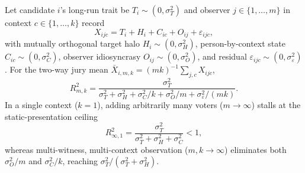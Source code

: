 \begin{proposition}\label{prop:twoway}
Let candidate $i$'s long-run trait be $T_i\sim(0,\sigma_T^2)$ and observer $j\in\{1,\dots,m\}$ in context $c\in\{1,\dots,k\}$ record
\begin{equation}
X_{ijc}=T_i+H_i+C_{ic}+O_{ij}+\varepsilon_{ijc},\label{eq:twowaymodel}
\end{equation}
with mutually orthogonal target halo $H_i\sim(0,\sigma_H^2)$, person-by-context state $C_{ic}\sim(0,\sigma_C^2)$, observer idiosyncrasy $O_{ij}\sim(0,\sigma_O^2)$, and residual $\varepsilon_{ijc}\sim(0,\sigma_\varepsilon^2)$. For the two-way jury mean $\bar X_{i,m,k}=(mk)^{-1}\sum_{j,c}X_{ijc}$,
\begin{equation}
R^2_{m,k}=\frac{\sigma_T^2}{\sigma_T^2+\sigma_H^2+\sigma_C^2/k+\sigma_O^2/m+\sigma_\varepsilon^2/(mk)}.\label{eq:twoway}
\end{equation}
In a single context ($k=1$), adding arbitrarily many voters ($m\to\infty$) stalls at the static-presentation ceiling
\begin{equation}
R^2_{\infty,1}=\frac{\sigma_T^2}{\sigma_T^2+\sigma_H^2+\sigma_C^2}<1,\label{eq:twowayceil}
\end{equation}
whereas multi-witness, multi-context observation ($m,k\to\infty$) eliminates both $\sigma_O^2/m$ and $\sigma_C^2/k$, reaching $\sigma_T^2/(\sigma_T^2+\sigma_H^2)$.
\end{proposition}

